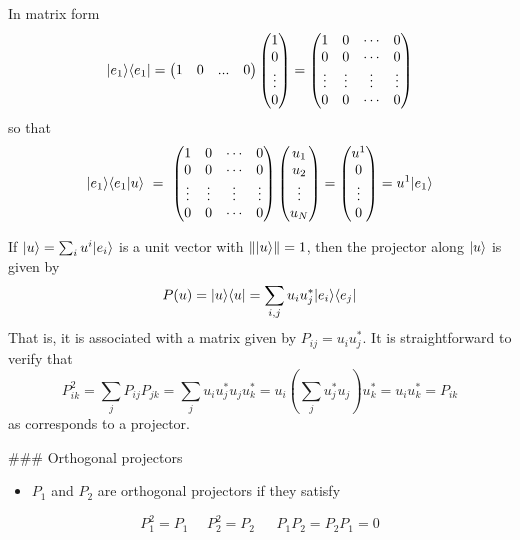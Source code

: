 \documentclass[11pt]{article}
\providecommand{\tightlist}{%
      \setlength{\itemsep}{0pt}\setlength{\parskip}{0pt}}
\begin{document}
In matrix form \[
 |e_1\rangle\langle e_1| = \begin{pmatrix} 1 & 0 & ...& 0 \end{pmatrix} \begin{pmatrix} 1 \\ 0 \\ \vdots\\ 0 \end{pmatrix} =
 \begin{pmatrix} 1 & 0 &  \cdots & 0 \\ 0 & 0  & \cdots & 0 \\ 
 \vdots & \vdots &\vdots & \vdots  \\
 0  & 0 & \cdots & 0\end{pmatrix}
 \] so that \[
    |e_1\rangle\langle e_1|u\rangle ~= ~\begin{pmatrix} 1 & 0 &  \cdots & 0 \\ 0 & 0  & \cdots & 0 \\ 
 \vdots & \vdots &\vdots & \vdots  \\
 0  & 0 & \cdots & 0\end{pmatrix} \begin{pmatrix} u_1 \\ u_2 \\ \vdots \\ u_N \end{pmatrix}
 = \begin{pmatrix} u^1 \\ 0 \\ \vdots \\ 0 \end{pmatrix} = u^1 |e_1\rangle
\]

    If \(|u\rangle = \sum_i u^i|e_i\rangle\) is a unit vector with
\(\||u\rangle\|=1\), then the projector along \(|u\rangle\) is given by \[
P(u) = | u\rangle \langle u| = \sum_{i,j} u_i u^*_j | e_i\rangle \langle e_j|
\] That is, it is associated with a matrix given by
\(P_{ij} = u_i u^*_j\). It is straightforward to verify that \[
P^2_{ik} = \sum_j P_{ij} P_{jk} = \sum_j u_i u^*_j u_j u^*_k = u_i \left(\sum_j u^*_j u_j \right) u_k^* = u_i u_k^* = P_{ik}
\] as corresponds to a projector.

    \#\#\# Orthogonal projectors

    \begin{itemize}
\tightlist
\item
  \(P_1\) and \(P_2\) are orthogonal projectors if they satisfy
\end{itemize}

\[
P_1^2 = P_1~~~~~~P_2^2 = P_2 ~~~~~~~P_1 P_2 = P_2 P_1 =  0
\]
\end{document}
